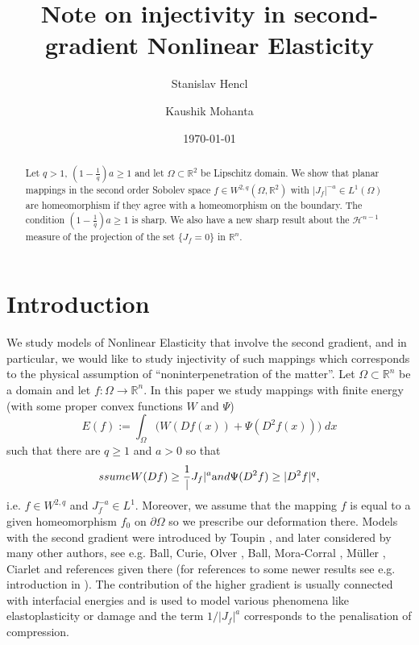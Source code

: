\documentclass[12pt,a4paper]{amsart}
\title{Note on injectivity in second-gradient Nonlinear Elasticity}
\author{Stanislav Hencl}
\author{Kaushik Mohanta}
\date{\today}
\theoremstyle{plain}
\theoremstyle{definition}
\def\eqn#1$$#2$${\begin{equation}\label#1#2\end{equation}}
\numberwithin{equation}{section}
\def\rn{\mathbb R^n}
\begin{document}
\begin{abstract}
    {Let $q>1$, $(1-\frac{1}{q})a\geq 1$ and let $\Omega\subset \mathbb{R}^2$ be Lipschitz domain. We show that planar mappings in the second order Sobolev space $f\in W^{2,q}(\Omega,\mathbb{R}^2)$ with $|J_f|^{-a}\in L^1(\Omega)$ are homeomorphism if they agree with a homeomorphism on the boundary. The condition $(1-\frac{1}{q})a\geq 1$ is sharp. We also have a new sharp result about the $\mathcal{H}^{n-1}$ measure of the projection of the set $\{J_f=0\}$ in $\mathbb{R}^n$.}
\end{abstract}


\maketitle

\section{Introduction}

We study models of Nonlinear Elasticity that involve the second gradient, and in particular, we would like to study injectivity of such mappings which corresponds to the physical assumption of ``noninterpenetration of the matter''. 
	Let $\Omega\subset\rn$ be a domain and let $f:\Omega\to\rn$. 
In this paper we study mappings with finite energy (with some proper convex functions $W$ and $\Psi$)
$$
E(f):=
\int_{\Omega} \bigl(W(Df(x))+\Psi(D^2 f(x))\bigr)\; dx
$$
such that there are $q\geq 1$ and $a>0$ so that  
\eqn{assume}
$$
W(Df)\geq \frac{1}{|J_f|^a}\text{ and }\Psi(D^2 f)\geq |D^2f|^q, 
$$
i.e. $f\in W^{2,q}$ and $J_f^{-a}\in L^1$. Moreover, we assume that the mapping $f$ is equal to a given homeomorphism $f_0$ on $\partial \Omega$ so we prescribe our deformation there. 
	 Models with the second gradient were introduced by Toupin \cite{T}, \cite{T2}
	and later considered by many other authors, see e.g. Ball, Curie, Olver \cite{BCO}, Ball, Mora-Corral \cite{BMC}, M\"uller \cite[Section 6]{Mbook}, Ciarlet \cite[page 93]{Ci} and references given there 
	(for references to some newer results see e.g. introduction in \cite{CHMS}). 
	The contribution of the higher gradient is usually connected with interfacial energies and is used to model various phenomena like elastoplasticity or damage and the term $1/|J_f|^a$ corresponds to the penalisation of compression. 
\end{document}
